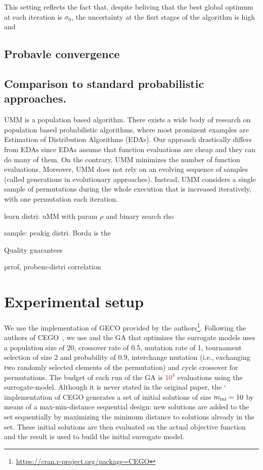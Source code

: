 \documentclass[runningheads]{llncs}
\begin{document}
This setting reflects the fact that, despite beliving that the best global optimum at each iteration is $\sigma_0$, the uncertainty at the fisrt stages of the algorithm is high and


\subsection{Probavle convergence}

\subsection{Comparison to standard probabilistic approaches.}
UMM is a population based algorithm. There exists a wide body of research on population based probabilistic algorithms, where most prominent examples are Estimation of Distribution Algorithms (EDAs). Our approach drastically differs from EDAs since EDAs assume that function evaluations are cheap and they can do many of them. On the contrary, UMM minimizes the number of function evaluations. Moreover, UMM does not rely on an evolving sequence of samples (called generations in evolutionary approaches). Instead, UMM considers a single sample of permutations during the whole execution that is increased iteratively, with one permutation each iteration. 







learn distri: uMM with param $\rho$ and binary search rho

sample: peakig distri. Borda is the 

Quality guarantees

prrof, probem-distri correlation


\section{Experimental setup}

We use the implementation of GECO provided by the
authors\footnote{\url{https://cran.r-project.org/package=CEGO}}. Following the
authors of CEGO~\citep{ZaeStoFriFisNauBar2014,ZaeStoBar2014:ppsn}, we use and
the GA that optimizes the surrogate models uses a population size of 20,
crossover rate of 0.5, mutation rate of 1, tournament selection of size 2 and
probability of 0.9, interchange mutation (i.e., exchanging two randomly
selected elements of the permutation) and cycle crossover for permutations. The
budget of each run of the GA is \textcolor{red}{$10^4$} evaluations using the
surrogate-model. Although it is never stated in the original paper, the	`
implementation of CEGO generates a set of initial solutions of size
$m_\text{ini}=10$ by means of a max-min-distance sequential design: new solutions
are added to the set sequentially by maximizing the minimum distance to
solutions already in the set. These initial solutions are then evaluated on the
actual objective function and the result is used to build the initial surrogate
model.%
\end{document}
